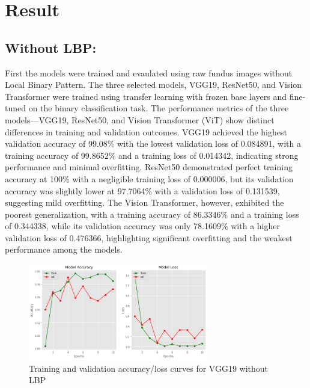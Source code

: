 \documentclass{ijclclp}
\begin{document}
\section{Result}\label{sec:result}
\begin{flushleft}
    \subsection{Without LBP:}
    \vspace{1em}
    \justifying
    First the models were trained and evaulated using raw fundus images without Local Binary Pattern. The three selected models, VGG19, ResNet50, and Vision Transformer were trained using transfer learning with frozen base layers and fine-tuned on the binary classification task. The performance metrics of the three models—VGG19, ResNet50, and Vision Transformer (ViT) show distinct differences in training and validation outcomes. VGG19 achieved the highest validation accuracy of 99.08\% with the lowest validation loss of 0.084891, with a training accuracy of 99.8652\% and a training loss of 0.014342, indicating strong performance and minimal overfitting. ResNet50 demonstrated perfect training accuracy at 100\% with a negligible training loss of 0.000006, but its validation accuracy was slightly lower at 97.7064\% with a validation loss of 0.131539, suggesting mild overfitting. The Vision Transformer, however, exhibited the poorest generalization, with a training accuracy of 86.3346\% and a training loss of 0.344338, while its validation accuracy was only 78.1609\% with a higher validation loss of 0.476366, highlighting significant overfitting and the weakest performance among the models.
    \end{flushleft}
\vspace{1em}
\begin{figure}[htbp]
    \centering
    \includegraphics[width=0.70\textwidth]{image9.png}
    \caption{Training and validation accuracy/loss curves for VGG19 without LBP}
    \label{fig:vgg19_no_lbp}
\end{figure}
\end{document}
